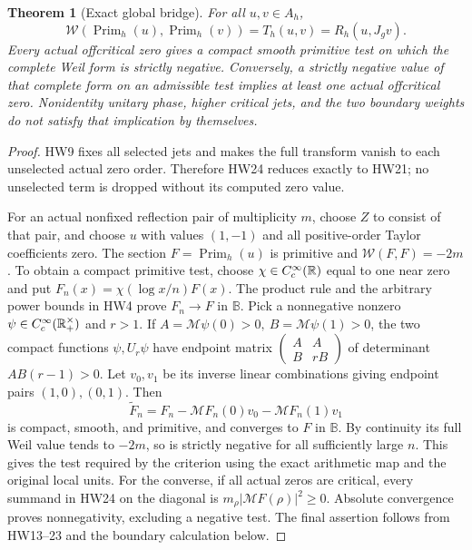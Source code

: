 \documentclass[11pt,a4paper]{article}
\newtheorem{theorem}{Theorem}[section]
\theoremstyle{definition}\newtheorem{definition}[theorem]{Definition}
\newcommand{\B}{\mathbb B}\newcommand{\N}{\mathbb N}
\providecommand{\M}{\mathcal M}
\begin{document}
\begin{theorem}[Exact global bridge]\label{hw:globalbridge}
For all \(u,v\in A_h\),
\[
 \mathcal W(\operatorname{Prim}_h(u),
             \operatorname{Prim}_h(v))
        =T_h(u,v)=R_h(u,J_gv).
 \tag{HW30}\label{hw:bridge}
\]
Every actual offcritical zero gives a compact smooth primitive
test on which the complete Weil form is strictly negative.
Conversely, a strictly negative value of that complete form on
an admissible test implies at least one actual offcritical zero.
Nonidentity unitary phase, higher critical jets, and the two
boundary weights do not satisfy that implication by themselves.
\end{theorem}
\begin{proof}
HW9 fixes all selected jets and makes the full transform vanish
to each unselected actual zero order. Therefore HW24 reduces
exactly to HW21; no unselected term is dropped without its
computed zero value.

For an actual nonfixed reflection pair of multiplicity \(m\),
choose \(Z\) to consist of that pair, and choose \(u\) with
values \((1,-1)\) and all positive-order Taylor coefficients
zero. The section \(F=\operatorname{Prim}_h(u)\) is primitive
and \(\mathcal W(F,F)=-2m\).
To obtain a compact primitive test, choose
\(\chi\in C_c^\infty(\mathbb R)\) equal to one near zero and put
\(F_n(x)=\chi(\log x/n)F(x)\).
The product rule and the arbitrary power bounds in HW4
prove \(F_n\to F\) in \(\B\).
Pick a nonnegative nonzero \(\psi\in C_c^\infty(\mathbb R_+^\times)\)
and \(r>1\). If \(A=\M\psi(0)>0,\ B=\M\psi(1)>0\),
the two compact functions \(\psi,U_r\psi\) have endpoint
matrix \(\left(\begin{smallmatrix}A&A\\ B&rB\end{smallmatrix}\right)\)
of determinant \(AB(r-1)>0\).
Let \(v_0,v_1\) be its inverse linear combinations giving
endpoint pairs \((1,0),(0,1)\).
Then
\[
 \widetilde F_n=F_n-\M F_n(0)v_0-\M F_n(1)v_1
 \tag{HW31}
\]
is compact, smooth, and primitive, and converges to \(F\)
in \(\B\). By continuity its full Weil value tends to
\(-2m\), so is strictly negative for all sufficiently large
\(n\). This gives the test required by the criterion using
the exact arithmetic map and the original local units.
For the converse, if all actual zeros are critical, every
summand in HW24 on the diagonal is
\(m_\rho|\M F(\rho)|^2\ge0\).
Absolute convergence proves nonnegativity, excluding a
negative test. The final assertion follows from HW13--23
and the boundary calculation below.
\end{proof}
\end{document}
